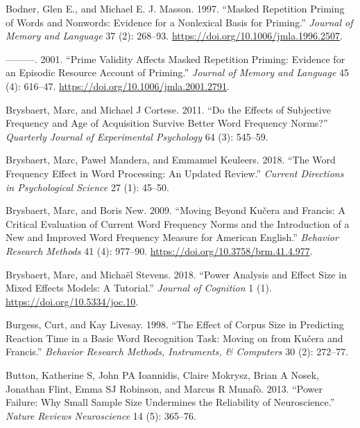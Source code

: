 \documentclass[
]{interact}
\newlength{\cslhangindent}
\newenvironment{CSLReferences}[2] %
 {\begin{list}{}{%
  \setlength{\itemindent}{0pt}
  \setlength{\leftmargin}{0pt}
  \setlength{\parsep}{0pt}
  \ifodd #1
   \setlength{\leftmargin}{\cslhangindent}
   \setlength{\itemindent}{-1\cslhangindent}
  \fi
  \setlength{\itemsep}{#2\baselineskip}}}
 {\end{list}}
\begin{document}
\begin{CSLReferences}{1}{0}
Bodner, Glen E., and Michael E. J. Masson. 1997. {``Masked Repetition
Priming of Words and Nonwords: Evidence for a Nonlexical Basis for
Priming.''} \emph{Journal of Memory and Language} 37 (2): 268--93.
\url{https://doi.org/10.1006/jmla.1996.2507}.

---------. 2001. {``Prime Validity Affects Masked Repetition Priming:
Evidence for an Episodic Resource Account of Priming.''} \emph{Journal
of Memory and Language} 45 (4): 616--47.
\url{https://doi.org/10.1006/jmla.2001.2791}.

Brysbaert, Marc, and Michael J Cortese. 2011. {``Do the Effects of
Subjective Frequency and Age of Acquisition Survive Better Word
Frequency Norms?''} \emph{Quarterly Journal of Experimental Psychology}
64 (3): 545--59.

Brysbaert, Marc, Paweł Mandera, and Emmanuel Keuleers. 2018. {``The Word
Frequency Effect in Word Processing: An Updated Review.''} \emph{Current
Directions in Psychological Science} 27 (1): 45--50.

Brysbaert, Marc, and Boris New. 2009. {``Moving Beyond Ku{č}era and
Francis: A Critical Evaluation of Current Word Frequency Norms and the
Introduction of a New and Improved Word Frequency Measure for American
English.''} \emph{Behavior Research Methods} 41 (4): 977--90.
\url{https://doi.org/10.3758/brm.41.4.977}.

Brysbaert, Marc, and Michaël Stevens. 2018. {``Power Analysis and Effect
Size in Mixed Effects Models: A Tutorial.''} \emph{Journal of Cognition}
1 (1). \url{https://doi.org/10.5334/joc.10}.

Burgess, Curt, and Kay Livesay. 1998. {``The Effect of Corpus Size in
Predicting Reaction Time in a Basic Word Recognition Task: Moving on
from Ku{č}era and Francis.''} \emph{Behavior Research Methods,
Instruments, \& Computers} 30 (2): 272--77.

Button, Katherine S, John PA Ioannidis, Claire Mokrysz, Brian A Nosek,
Jonathan Flint, Emma SJ Robinson, and Marcus R Munafò. 2013. {``Power
Failure: Why Small Sample Size Undermines the Reliability of
Neuroscience.''} \emph{Nature Reviews Neuroscience} 14 (5): 365--76.


\end{CSLReferences}
\end{document}
